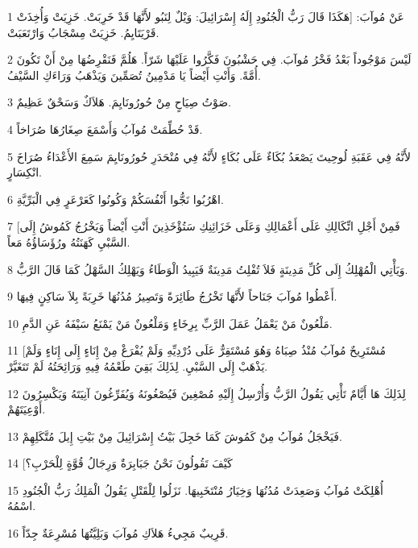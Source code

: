 \par 1 عَنْ مُوآبَ: [هَكَذَا قَالَ رَبُّ الْجُنُودِ إِلَهُ إِسْرَائِيلَ: وَيْلٌ لِنَبُو لأَنَّهَا قَدْ خَرِبَتْ. خَزِيَتْ وَأُخِذَتْ قَرْيَتَايِمُ. خَزِيَتْ مِسْجَابُ وَارْتَعَبَتْ.
\par 2 لَيْسَ مَوْجُوداً بَعْدُ فَخْرُ مُوآبَ. فِي حَشْبُونَ فَكَّرُوا عَلَيْهَا شَرّاً. هَلُمَّ فَنَقْرِضُهَا مِنْ أَنْ تَكُونَ أُمَّةً. وَأَنْتِ أَيْضاً يَا مَدْمِينُ تُصَمِّينَ وَيَذْهَبُ وَرَاءَكِ السَّيْفُ.
\par 3 صَوْتُ صِيَاحٍ مِنْ حُورُونَايِمَ. هَلاَكٌ وَسَحْقٌ عَظِيمٌ.
\par 4 قَدْ حُطِّمَتْ مُوآبُ وَأَسْمَعَ صِغَارُهَا صُرَاخاً.
\par 5 لأَنَّهُ فِي عَقَبَةِ لُوحِيتَ يَصْعَدُ بُكَاءٌ عَلَى بُكَاءٍ لأَنَّهُ فِي مُنْحَدَرِ حُورُونَايِمَ سَمِعَ الأَعْدَاءُ صُرَاخَ انْكِسَارٍ.
\par 6 اهْرُبُوا نَجُّوا أَنْفُسَكُمْ وَكُونُوا كَعَرْعَرٍ فِي الْبَرِّيَّةِ.
\par 7 [فَمِنْ أَجْلِ اتِّكَالِكِ عَلَى أَعْمَالِكِ وَعَلَى خَزَائِنِكِ سَتُؤْخَذِينَ أَنْتِ أَيْضاً وَيَخْرُجُ كَمُوشُ إِلَى السَّبْيِ كَهَنَتُهُ ورُؤَسَاؤُهُ مَعاً.
\par 8 وَيَأْتِي الْمُهْلِكُ إِلَى كُلِّ مَدِينَةٍ فَلاَ تُفْلِتُ مَدِينَةٌ فَيَبِيدُ الْوَطَاءُ وَيَهْلِكُ السَّهْلُ كَمَا قَالَ الرَّبُّ.
\par 9 أَعْطُوا مُوآبَ جَنَاحاً لأَنَّهَا تَخْرُجُ طَائِرَةً وَتَصِيرُ مُدُنُهَا خَرِبَةً بِلاَ سَاكِنٍ فِيهَا.
\par 10 مَلْعُونٌ مَنْ يَعْمَلُ عَمَلَ الرَّبِّ بِرِخَاءٍ وَمَلْعُونٌ مَنْ يَمْنَعُ سَيْفَهُ عَنِ الدَّمِ.
\par 11 [مُسْتَرِيحٌ مُوآبُ مُنْذُ صِبَاهُ وَهُوَ مُسْتَقِرٌّ عَلَى دُرْدِيِّهِ وَلَمْ يُفْرَغْ مِنْ إِنَاءٍ إِلَى إِنَاءٍ وَلَمْ يَذْهَبْ إِلَى السَّبْيِ. لِذَلِكَ بَقِيَ طَعْمُهُ فِيهِ وَرَائِحَتُهُ لَمْ تَتَغَيَّرْ.
\par 12 لِذَلِكَ هَا أَيَّامٌ تَأْتِي يَقُولُ الرَّبُّ وَأُرْسِلُ إِلَيْهِ مُصْغِينَ فَيُصْغُونَهُ وَيُفَرِّغُونَ آنِيَتَهُ وَيَكْسِرُونَ أَوْعِيَتَهُمْ.
\par 13 فَيَخْجَلُ مُوآبُ مِنْ كَمُوشَ كَمَا خَجِلَ بَيْتُ إِسْرَائِيلَ مِنْ بَيْتِ إِيلَ مُتَّكَلِهِمْ.
\par 14 [كَيْفَ تَقُولُونَ نَحْنُ جَبَابِرَةٌ وَرِجَالُ قُوَّةٍ لِلْحَرْبِ؟
\par 15 أُهْلِكَتْ مُوآبُ وَصَعِدَتْ مُدُنُهَا وَخِيَارُ مُنْتَخَبِيهَا. نَزَلُوا لِلْقَتْلِ يَقُولُ الْمَلِكُ رَبُّ الْجُنُودِ اسْمُهُ.
\par 16 قَرِيبٌ مَجِيءُ هَلاَكِ مُوآبَ وَبَلِيَّتُهَا مُسْرِعَةٌ جِدّاً.
